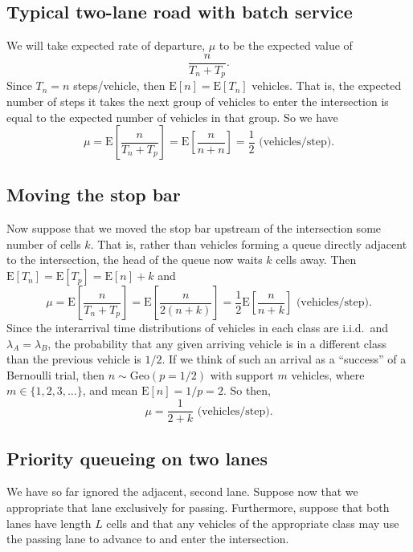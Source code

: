\documentclass{amsart}
\begin{document}
\subsection{Typical two-lane road with batch service}
We will take expected rate of departure, $\mu$ to be the expected value of
\begin{equation*}
  \frac{n}{T_n+T_p}.
\end{equation*}
Since $T_n=n$ steps/vehicle, then $\text{E}[n]=\text{E}[T_n]$ vehicles.
That is, the expected number of steps it takes the next group of vehicles to
enter the intersection is equal to the expected number of vehicles in that
group. So we have
\begin{equation*}
  \mu = \text{E}\left[\frac{n}{T_n+T_p}\right]
  =\text{E}\left[\frac{n}{n+n}\right] = \frac{1}{2}\text{ (vehicles/step)}.
\end{equation*}

\subsection{Moving the stop bar}
Now suppose that we moved the stop bar upstream of the intersection some number of cells $k$.
That is, rather than vehicles forming a queue directly adjacent to the
intersection, the head of the queue now waits $k$ cells away.
Then $\text{E}[T_n]=\text{E}[T_p]=\text{E}[n]+k$ and
\begin{equation*}
  \mu = \text{E}\left[\frac{n}{T_n+T_p}\right]
  = \text{E}\left[\frac{n}{2(n+k)}\right]
  = \frac{1}{2}\text{E}\left[\frac{n}{n+k}\right]\text{ (vehicles/step)}.
\end{equation*}
Since the interarrival time distributions of vehicles in each class are i.i.d.\ and
$\lambda_A=\lambda_B$, the probability that any given arriving vehicle is in a
different class than the previous vehicle is $1/2$.
If we think of such an arrival as a ``success'' of a Bernoulli trial,
then $n\sim \text{Geo}(p=1/2)$ with support $m$ vehicles, where
$m\in\{1,2,3,\dots\}$, and mean $\text{E}[n]=1/p=2$.
So then,
\begin{equation*}
  \mu=\frac{1}{2+k}\text{ (vehicles/step)}.
\end{equation*}

\subsection{Priority queueing on two lanes}
We have so far ignored the adjacent, second lane. Suppose now that we appropriate that
lane exclusively for passing. Furthermore, suppose that both lanes have length
$L$ cells and that any vehicles of the appropriate class may use the passing
lane to advance to and enter the intersection.
\end{document}
